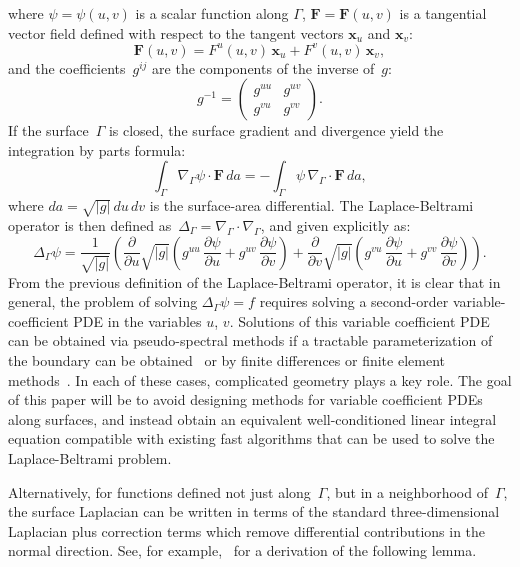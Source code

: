 \documentclass[11pt]{article}
\newcommand{\surfdiv}{\nabla_\Gamma \cdot}
\newcommand{\surfgrad}{\nabla_\Gamma}
\newcommand{\surflap}{\Delta_\Gamma}
\newcommand{\bx}{\bm x}
\newcommand{\bF}{\bm F}
\numberwithin{equation}{section}
\begin{document}
where $\psi = \psi(u,v)$ is a scalar function along $\Gamma$,
$\bF = \bF(u,v)$ is a tangential vector field defined with respect to 
the tangent vectors $\bx_u$ and $\bx_v$:
\begin{equation}
  \bF(u,v) =  F^u(u,v) \, \bx_u + F^v(u,v) \, \bx_v ,
\end{equation}
and the coefficients~$g^{ij}$ are the components of the inverse
of~$g$:
\begin{equation}
  g^{-1} =  \begin{pmatrix}
g^{uu} &  g^{uv} \\
g^{vu} &  g^{vv}
\end{pmatrix}.
\end{equation}
If the surface~$\Gamma$ is closed, 
the surface gradient and divergence yield the integration by parts
formula:
\begin{equation}
\int_\Gamma \surfgrad \psi \cdot \bF \, da = -\int_\Gamma \psi \, 
\surfdiv \bF \, da, 
\end{equation}
where $da = \sqrt{|g|} \, du \, dv$ is the surface-area differential.
The Laplace-Beltrami operator is then defined as~$\surflap =
\surfdiv\surfgrad$, and given explicitly as:
\begin{equation}
  \surflap \psi = \frac{1}{\sqrt{|g|}} \left( 
    \frac{\partial}{\partial u} \sqrt{|g|} 
    \left( g^{uu} \, \frac{\partial\psi }{\partial u} + 
    g^{uv} \, \frac{\partial\psi }{\partial v} \right) + 
  \frac{\partial}{\partial v} \sqrt{|g|} \left( 
    g^{vu} \, \frac{\partial\psi }{\partial u} + 
    g^{vv} \, \frac{\partial\psi }{\partial v} \right)
\right).
\end{equation}
From the previous definition of the Laplace-Beltrami operator, it is
clear that in general, the problem of solving $\surflap \psi = f$
requires solving a second-order variable-coefficient PDE in the
variables $u$, $v$. Solutions of this variable coefficient PDE can be
obtained via pseudo-spectral methods if a tractable parameterization
of the boundary can be obtained~\cite{imbertgerard_2017} or by finite
differences or finite element methods~\cite{bonito_2013,dziuk_2013}. In each of
these cases, complicated geometry plays a key role.
The goal of this paper will be to avoid designing methods for variable
coefficient PDEs along surfaces, and instead obtain an equivalent
well-conditioned linear integral equation compatible with existing
fast algorithms that can be used to solve the Laplace-Beltrami problem.

Alternatively, for functions defined not just along~$\Gamma$, but in a
neighborhood of~$\Gamma$, the surface Laplacian can be written in terms of the
standard three-dimensional Laplacian plus correction terms
which remove differential contributions in the normal direction.
See, for example,~\cite{nedelec} for a derivation of the
following lemma.
\end{document}
